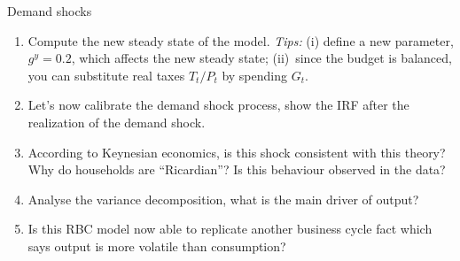 \documentclass[a4paper,12pt]{article}%
\begin{document}
\begin{myexercise}{Demand shocks}
\begin{enumerate}
\item Compute the new steady state of the model. \textit{Tips:} (i) define a
new parameter, $g^{y}=0.2$, which affects the new steady state; (ii)\ since
the budget is balanced, you can substitute real taxes $T_{t}/P_{t}$ by
spending $G_{t}$.

\item Let's now calibrate the demand shock process, show the IRF after the
realization of the demand shock.

\item According to Keynesian economics, is this shock consistent with this
theory? Why do households are \textquotedblleft Ricardian\textquotedblright?
Is this behaviour observed in the data?

\item Analyse the variance decomposition, what is the main driver of output?

\item Is this RBC model now able to replicate another business cycle fact
which says output is more volatile than consumption?
\end{enumerate}

%

\end{myexercise}%


\newpage%

\footnotesize

%
\normalsize
\end{document}
